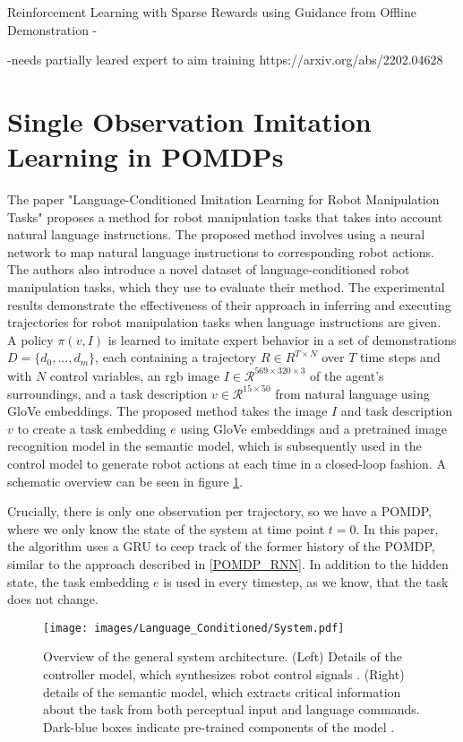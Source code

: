 Reinforcement Learning with Sparse Rewards using Guidance from Offline Demonstration - 

-needs partially leared expert to aim training
https://arxiv.org/abs/2202.04628 

\section{Single Observation Imitation Learning in POMDPs}
\label{LCILRM}
The paper "Language-Conditioned Imitation Learning for Robot Manipulation Tasks" \cite{stepputtis2020languageconditioned} proposes a method for robot manipulation tasks that takes 
into account natural language instructions. The proposed method involves using a neural network to map natural language instructions to 
corresponding robot actions. The authors also introduce a novel dataset of language-conditioned robot manipulation tasks, which they use to evaluate 
their method. The experimental results demonstrate the effectiveness of their approach in inferring and executing trajectories for robot manipulation 
tasks when language instructions are given.\\

A policy $\pi(v,I)$ is learned to imitate expert behavior in a set of demonstrations $D = \{d_0,...,d_m\}$, each containing a trajectory 
$R \in R^{T \times N}$ over $T$ time steps and with $N$ control variables, an rgb image $I \in \mathcal{R}^{569 \times 320 \times 3}$ of the agent's surroundings, 
and a task description $v \in \mathcal{R}^{15 \times 50}$ from natural language using GloVe \cite{pennington-etal-2014-glove} embeddings. The proposed method takes the image $I$ and task description $v$ 
to create a task embedding $e$ using GloVe embeddings and a pretrained image recognition model in the semantic model, 
which is subsequently used in the control model to generate robot actions at each time in a closed-loop 
fashion. A schematic overview can be seen in figure \ref{language_imitation}.

Crucially, there is only one observation per trajectory, so we have a POMDP, where we only know the state of the system at time point $t=0$. In this paper, the 
algorithm uses a GRU to ceep track of the former history of the POMDP, similar to the approach described in \ref{POMDP_RNN}. In addition to the hidden state, 
the task embedding $e$ is used in every timestep, as we know, that the task does not change. \\

\begin{figure}[htbp]
    \centering
    \texttt{[image: images/Language\_Conditioned/System.pdf]}
    \caption{Overview of the general system architecture. (Left) Details of the controller model, which
    synthesizes robot control signals . (Right) details of the semantic model, which extracts critical
    information about the task from both perceptual input and language commands. Dark-blue boxes
    indicate pre-trained components of the model \cite{stepputtis2020languageconditioned}.}
    \label{language_imitation}
\end{figure}

